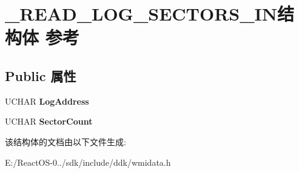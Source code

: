 \hypertarget{struct___r_e_a_d___l_o_g___s_e_c_t_o_r_s___i_n}{}\section{\+\_\+\+R\+E\+A\+D\+\_\+\+L\+O\+G\+\_\+\+S\+E\+C\+T\+O\+R\+S\+\_\+\+I\+N结构体 参考}
\label{struct___r_e_a_d___l_o_g___s_e_c_t_o_r_s___i_n}
\subsection*{Public 属性}
\begin{DoxyCompactItemize}
\item 
\mbox{\label{struct___r_e_a_d___l_o_g___s_e_c_t_o_r_s___i_n_a40369d6106a70714fa4c36a2d67a3906}} 
U\+C\+H\+AR {\bfseries Log\+Address}
\item 
\mbox{\label{struct___r_e_a_d___l_o_g___s_e_c_t_o_r_s___i_n_aef4eb238f0c1762588ca53710809a253}} 
U\+C\+H\+AR {\bfseries Sector\+Count}
\end{DoxyCompactItemize}


该结构体的文档由以下文件生成\+:\begin{DoxyCompactItemize}
\item 
E\+:/\+React\+O\+S-\/0../sdk/include/ddk/wmidata.\+h\end{DoxyCompactItemize}
